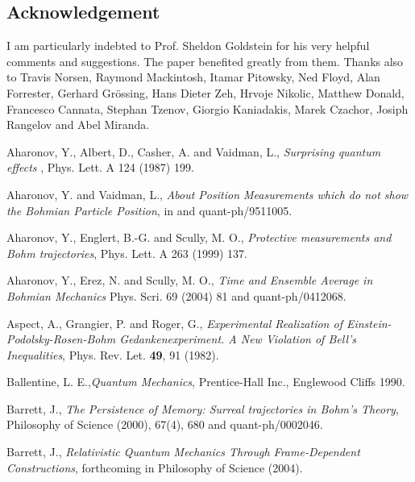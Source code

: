 \subsection*{Acknowledgement}
I am particularly indebted to Prof. Sheldon Goldstein for his very helpful comments and suggestions. The paper benefited greatly from 
them. Thanks also to Travis Norsen, Raymond Mackintosh, Itamar Pitowsky, Ned Floyd, Alan Forrester, Gerhard Gr\"ossing, 
Hans Dieter Zeh, Hrvoje Nikolic, Matthew Donald, Francesco Cannata, Stephan Tzenov, Giorgio Kaniadakis, Marek Czachor, Josiph Rangelov 
and Abel Miranda.   

\begin{thebibliography}{10}

  Aharonov, Y., Albert, D., Casher, A. and Vaidman, L., {\em Surprising quantum effects }, Phys. Lett. A 124 (1987) 199. 

 Aharonov, Y. and Vaidman, L., {\em About Position Measurements
  which do not show the Bohmian Particle Position}, in \cite{appraisal} and quant-ph/9511005.

  Aharonov, Y., Englert, B.-G. and Scully, M. O., {\em Protective measurements and Bohm trajectories}, Phys. Lett. 
  A 263 (1999) 137. 

  Aharonov, Y., Erez, N. and Scully, M. O., {\em Time and Ensemble Average in Bohmian Mechanics} Phys. Scri.  69 
  (2004) 81 and quant-ph/0412068.

 Aspect, A., Grangier, P. and Roger, G., {\em Experimental 
Realization of Einstein-Podolsky-Rosen-Bohm Gedankenexperiment. A New
Violation of Bell's Inequalities}, Phys. Rev. Let. {\bf 49}, 91 (1982). 

 Ballentine, L. E.,{\em Quantum Mechanics}, Prentice-Hall 
Inc., Englewood Cliffs 1990. 

 Barrett, J., {\em The Persistence of Memory: Surreal 
trajectories in Bohm's Theory}, Philosophy of Science (2000), 67(4), 680
and quant-ph/0002046.

  Barrett, J., {\em Relativistic Quantum Mechanics Through Frame-Dependent Constructions}, forthcoming in Philosophy of 
Science (2004).


\end{thebibliography}
